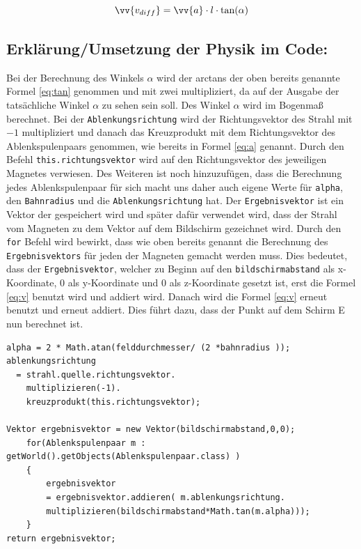 \begin{equation}
    \label{eq:v}
    \vv{v_{diff}} =  \vv{a} \cdot l \cdot \tan(\alpha)
\end{equation}

\subsection{Erklärung/Umsetzung der Physik im Code:}

Bei der Berechnung des Winkels $\alpha$ wird der arctans der oben bereits genannte Formel \ref{eq:tan} genommen und mit zwei multipliziert, da auf der Ausgabe der tatsächliche Winkel $\alpha$ zu sehen sein soll.
Des Winkel $\alpha$ wird im Bogenmaß berechnet.
Bei der \lstinline$Ablenkungsrichtung$ wird der Richtungsvektor des Strahl mit $-1$ multipliziert und danach das Kreuzprodukt mit dem Richtungsvektor des Ablenkspulenpaars genommen, wie bereits in Formel \ref{eq:a} genannt.
Durch den Befehl \lstinline$this.richtungsvektor$ wird auf den Richtungsvektor des jeweiligen Magnetes verwiesen.
Des Weiteren ist noch hinzuzufügen, dass die Berechnung jedes Ablenkspulenpaar für sich macht uns daher auch eigene Werte für \lstinline$alpha$, den \lstinline$Bahnradius$ und die \lstinline$Ablenkungsrichtung$ hat.
Der \lstinline$Ergebnisvektor$ ist ein Vektor der gespeichert wird und später dafür verwendet wird, dass der Strahl vom Magneten zu dem Vektor auf dem Bildschirm gezeichnet wird.
Durch den \lstinline$for$ Befehl wird bewirkt, dass wie oben bereits genannt die Berechnung des \lstinline$Ergebnisvektors$ für jeden der Magneten gemacht werden muss.
Dies bedeutet, dass der \lstinline$Ergebnisvektor$, welcher zu Beginn auf den \lstinline$bildschirmabstand$ als x- Koordinate, $0$ als y-Koordinate und 0 als z-Koordinate gesetzt ist, erst die Formel \ref{eq:v} benutzt wird und addiert wird.
Danach wird die Formel \ref{eq:v} erneut benutzt und erneut addiert. Dies führt dazu, dass der Punkt auf dem Schirm E nun berechnet ist.

\begin{lstlisting}
alpha = 2 * Math.atan(felddurchmesser/ (2 *bahnradius ));
ablenkungsrichtung
  = strahl.quelle.richtungsvektor.
    multiplizieren(-1).
    kreuzprodukt(this.richtungsvektor);

Vektor ergebnisvektor = new Vektor(bildschirmabstand,0,0);
    for(Ablenkspulenpaar m : getWorld().getObjects(Ablenkspulenpaar.class) )
    {
        ergebnisvektor 
        = ergebnisvektor.addieren( m.ablenkungsrichtung.
        multiplizieren(bildschirmabstand*Math.tan(m.alpha)));
    }
return ergebnisvektor;

\end{lstlisting}

